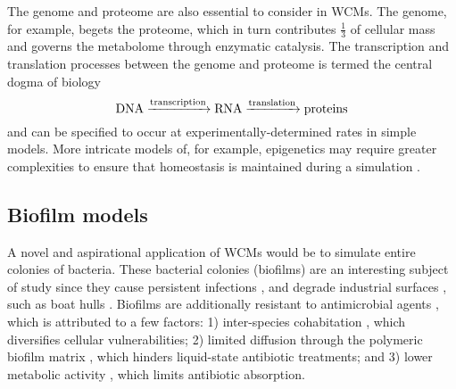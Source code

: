 The genome and proteome are also essential to consider in WCMs. The genome, for example, begets the proteome, which in turn contributes $\frac{1}{3}$ of cellular mass \cite{Vakser2019ComputationalCell} and governs the metabolome through enzymatic catalysis. The transcription and translation processes between the genome and proteome is termed the central dogma of biology
\begin{equation} \label{central_dogma}
    \ce{DNA ->[transcription] RNA ->[translation] proteins}
\end{equation}
and can be specified to occur at experimentally-determined rates in simple models. More intricate models of, for example, epigenetics may require greater complexities to ensure that homeostasis is maintained during a simulation \cite{Karr2012}.

\subsection{Biofilm models}
A novel and aspirational application of WCMs would be to simulate entire colonies of bacteria. These bacterial colonies (biofilms)  \cite{Otto2018StaphylococcalBiofilms,Mazza2016TheIntroduction} are an interesting subject of study since they cause persistent infections \cite{Metcalf2013BiofilmEvidence,Jamal2018BacterialInfections,Singhai2012AResistance,Coenye2007BiofilmFactors,Baldan2014AdaptationCo-infection, Kropec2005Poly-N-AcetylglucosamineInfection,Potera1999ForgingDisease,Ramsey2004PseudomonasEnvironments,Stewart2014BiophysicsInfection}, and degrade industrial surfaces \cite{Herzberg2007BiofoulingPressure,Herzberg2008PhysiologyAeruginosa,Matin2011BiofoulingPrevention}, such as boat hulls \cite{Schultz2011EconomicShip,1952ChapterFouling,Coetser2005BiofoulingSystems,Callow2002MarineProblem}. Biofilms are additionally resistant to antimicrobial agents \cite{Lewis2001RiddleResistance}, which is attributed to a few factors: 1) inter-species cohabitation \cite{Pereira2011SusceptibilityStudy}, which diversifies cellular vulnerabilities; 2) limited diffusion through the polymeric biofilm matrix \cite{Suci1994InvestigationBiofilms,Hoyle1992PseudomonasPiperacillin,LeChevallier1988InactivationBacteria,Dunne1993DiffusionBiofilm,DeBeer1994DirectDisinfection}, which hinders liquid-state antibiotic treatments; and 3) lower metabolic activity \cite{Mah2001MechanismsAgents,Sauer2004CharacterizationBiofilm,Suntharalingam2005QuorumFormation}, which limits antibiotic absorption.

